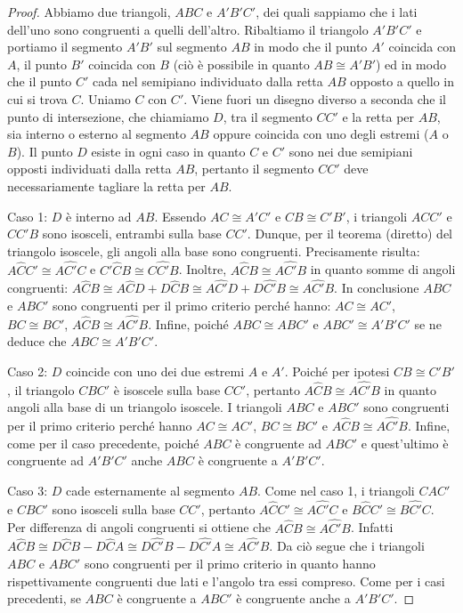 \begin{proof}
Abbiamo due triangoli, $ABC$ e $A'B'C'$, dei quali sappiamo che i lati dell'uno sono congruenti a quelli dell'altro. Ribaltiamo il triangolo $A'B'C'$ e portiamo il segmento $A'B'$ sul segmento $AB$ in modo che il punto $A'$ coincida con $A$, il punto $B'$ coincida con $B$ (ciò è possibile in quanto $AB\cong A'B'$) ed in modo che il punto $C'$ cada nel semipiano individuato dalla retta $AB$ opposto a quello in cui si trova $C$. Uniamo $C$ con $C'$. Viene fuori un disegno diverso a seconda che il punto di intersezione, che chiamiamo $D$, tra il segmento $CC'$ e la retta per $AB$, sia interno o esterno al segmento $AB$ oppure coincida con uno degli estremi ($A$ o $B$). Il punto $D$ esiste in ogni caso in quanto $C$ e $C'$ sono nei due semipiani opposti individuati dalla retta $AB$, pertanto il segmento $CC'$ deve necessariamente tagliare la retta per $AB$.

Caso 1: $D$ è interno ad $AB$.
Essendo $AC\cong A'C'$ e $CB\cong C'B'$, i triangoli $ACC'$ e $CC'B$ sono isosceli, entrambi sulla base $CC'$. Dunque, per il teorema (diretto) del triangolo isoscele, gli angoli alla base sono congruenti. Precisamente risulta: $A\widehat{C}C'\cong A\widehat{C'}C$ e $C'\widehat{C}B\cong C\widehat{C'}B$. Inoltre, $A\widehat{C}B\cong A\widehat{C'}B$ in quanto somme di angoli congruenti:
$A\widehat{C}B\cong A\widehat{C}D+D\widehat{C}B\cong A\widehat{C'}D+D\widehat{C'}B\cong A\widehat{C'}B$.
In conclusione $ABC$ e $ABC'$ sono congruenti per il primo criterio perché hanno: $AC\cong AC'$, $BC\cong BC'$, $A\widehat{C}B\cong A\widehat{C'}B$. 
Infine, poiché $ABC\cong ABC'$ e $ABC'\cong A'B'C'$ se ne deduce che $ABC\cong A'B'C'$.

Caso 2: $D$ coincide con uno dei due estremi $A$ e $A'$. 
Poiché per ipotesi $CB\cong C'B'$, il triangolo $CBC'$ è isoscele sulla base $CC'$, pertanto $A\widehat{C}B\cong A\widehat{C'}B$ in quanto angoli alla base di un triangolo isoscele. I triangoli $ABC$ e $ABC'$ sono congruenti per il primo criterio perché hanno $AC\cong AC'$, $BC\cong BC'$ e $A\widehat{C}B\cong A\widehat{C'}B$. Infine, come per il caso precedente, poiché $ABC$ è congruente ad $ABC'$ e quest'ultimo è congruente ad $A'B'C'$ anche $ABC$ è congruente a $A'B'C'$.

Caso 3: $D$ cade esternamente al segmento $AB$.
Come nel caso 1, i triangoli $CAC'$ e $CBC'$ sono isosceli sulla base $CC'$, pertanto $A\widehat{C}C'\cong A\widehat{C'}C$ e $B\widehat{C}C'\cong B\widehat{C'}C$. Per differenza di angoli congruenti si ottiene che $A\widehat{C}B\cong A\widehat{C'}B$.
Infatti $A\widehat{C}B\cong D\widehat{C}B-D\widehat{C}A\cong D\widehat{C'}B-D\widehat{C'}A\cong A\widehat{C'}B$. Da ciò segue che i triangoli $ABC$ e $ABC'$ sono congruenti per il primo criterio in quanto hanno rispettivamente congruenti due lati e l'angolo tra essi compreso. Come per i casi precedenti, se $ABC$ è congruente a $ABC'$ è congruente anche a $A'B'C'$.
\end{proof}


